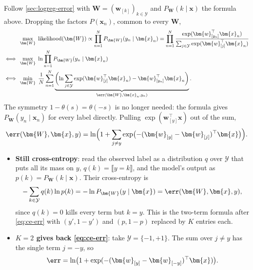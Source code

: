 \begin{remark}
    Follow \autoref{sec:logreg-error} with \(\bm{W} = (\bm{w}_{[k]})_{k \in
    \mathcal{Y}}\) and \(P_{\bm{W}}(k \mid \bm{x})\) the formula above.
    Dropping the factors \(P(\bm{x}_n)\), common to every \(\bm{W}\),
    \begin{align*}
        &\max_{\bm{W}} \; \text{likelihood}(\bm{W}) \propto \prod_{n=1}^N
        P_{\bm{W}}(y_n \mid \bm{x}_n) = \prod_{n=1}^N
        \frac{\exp(\bm{w}_{[y_n]}^\top \bm{x}_n)}{\sum_{j \in \mathcal{Y}}
        \exp(\bm{w}_{[j]}^\top \bm{x}_n)}\\
        \iff{} &\max_{\bm{W}} \; \ln \prod_{n=1}^N P_{\bm{W}}(y_n \mid
        \bm{x}_n)\\
        \iff{} &\min_{\bm{W}} \; \frac{1}{N} \sum_{n=1}^N \underbrace{\biggl(
        \ln \sum_{j \in \mathcal{Y}} \exp(\bm{w}_{[j]}^\top \bm{x}_n) -
        \bm{w}_{[y_n]}^\top \bm{x}_n \biggr)}_{\err(\bm{W}, \bm{x}_n, y_n)} .
    \end{align*}
    The symmetry \(1 - \theta(s) = \theta(-s)\) is no longer needed: the
    formula gives \(P_{\bm{W}}(y_n \mid \bm{x}_n)\) for every label directly.
    Pulling \(\exp(\bm{w}_{[y]}^\top \bm{x})\) out of the sum,
    \[
        \err(\bm{W}, \bm{x}, y) = \ln \Bigl( 1 + \sum_{j \neq y} \exp \bigl(
        -(\bm{w}_{[y]} - \bm{w}_{[j]})^\top \bm{x} \bigr) \Bigr) .
    \]
    \begin{itemize}
        \item \textbf{Still cross-entropy}: read the observed label as a
            distribution \(q\) over \(\mathcal{Y}\) that puts all its mass on
            \(y\), \(q(k) = \llbracket y = k \rrbracket\), and the model's
            output as \(p(k) = P_{\bm{W}}(k \mid \bm{x})\). Their
            cross-entropy is
            \[
                -\sum_{k \in \mathcal{Y}} q(k) \ln p(k)
                = -\ln P_{\bm{W}}(y \mid \bm{x})
                = \err(\bm{W}, \bm{x}, y) ,
            \]
            since \(q(k) = 0\) kills every term but \(k = y\). This is the
            two-term formula after \eqref{eq:ce-err} with
            \((y', 1 - y')\) and \((p, 1 - p)\) replaced by \(K\) entries
            each.
        \item \textbf{\(K = 2\) gives back \eqref{eq:ce-err}}: take
            \(\mathcal{Y} = \{-1, +1\}\). The sum over \(j \neq y\) has the
            single term \(j = -y\), so
            \[
                \err = \ln \bigl( 1 + \exp(-(\bm{w}_{[y]} -
                \bm{w}_{[-y]})^\top \bm{x}) \bigr) .
\]
\end{itemize}
\end{remark}
